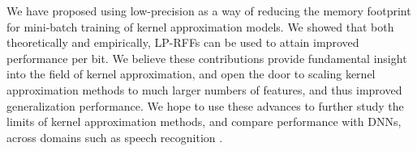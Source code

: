 We have proposed using low-precision as a way of reducing the memory footprint for mini-batch training of kernel approximation models. We showed that both theoretically and empirically, LP-RFFs can be used to attain improved performance per bit. We believe these contributions provide fundamental insight into the field of kernel approximation, and open the door to scaling kernel approximation methods to much larger numbers of features, and thus improved generalization performance. We hope to use these advances to further study the limits of kernel approximation methods, and compare performance with DNNs, across domains such as speech recognition \citep{may2017}.

